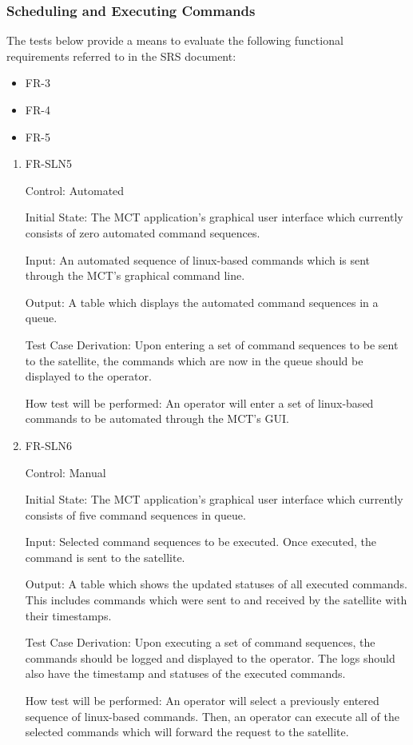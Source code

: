\documentclass[12pt, titlepage]{article}
\begin{document}
\subsubsection{Scheduling and Executing Commands}

The tests below provide a means to evaluate the following functional requirements referred to in the SRS document:
\begin{itemize}
    \item FR-3
    \item FR-4
    \item FR-5
\end{itemize}
		

\begin{enumerate}

\item{FR-SLN5\\}

Control: Automated
					
Initial State: The MCT application’s graphical user interface which currently consists of zero automated command sequences.
					
Input: An automated sequence of linux-based commands which is sent through the MCT’s graphical command line.
					
Output: A table which displays the automated command sequences in a queue.

Test Case Derivation: Upon entering a set of command sequences to be sent to the satellite, the commands which are now in the queue should be displayed to the operator.
					
How test will be performed: 
An operator will enter a set of linux-based commands to be automated through the MCT’s GUI.

\item{FR-SLN6\\}

Control: Manual
					
Initial State: The MCT application’s graphical user interface which currently consists of five command sequences in queue.
					
Input: Selected command sequences to be executed. Once executed, the command is sent to the satellite.

Output: 
A table which shows the updated statuses of all executed commands. This includes commands which were sent to and received by the satellite with their timestamps.

Test Case Derivation: Upon executing a set of command sequences, the commands should be logged and displayed to the operator. The logs should also have the timestamp and statuses of the executed commands.
					
How test will be performed: 
An operator will select a previously entered sequence of linux-based commands. Then, an operator can execute all of the selected commands which will forward the request to the satellite.

\end{enumerate}
\end{document}
